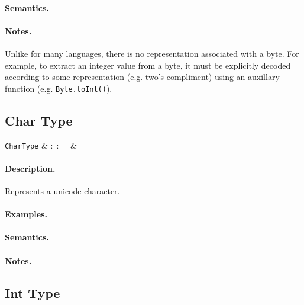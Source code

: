 \paragraph{Semantics.}

\paragraph{Notes.}  Unlike for many languages, there is no
representation associated with a byte. For example, to extract an
integer value from a byte, it must be explicitly decoded according to
some representation (e.g. two's compliment) using an auxillary function (e.g. \lstinline{Byte.toInt()}).



\subsection{Char Type}

\begin{syntax}
  \verb+CharType+ & $::=$ &  \\
\end{syntax}

\paragraph{Description.}  Represents a unicode character.

\paragraph{Examples.}

\paragraph{Semantics.}

\paragraph{Notes.} 


\subsection{Int Type}

